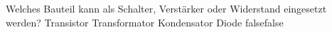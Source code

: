     {Welches Bauteil kann als Schalter, Verstärker oder Widerstand eingesetzt werden?}
    {Transistor}
    {Transformator}
    {Kondensator}
    {Diode}
    {false}{false}